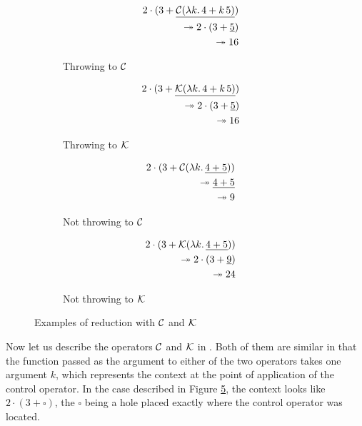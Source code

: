 \begin{figure}
\centering
\begin{subfigure}[t]{0.4\textwidth}
\begin{eqnarray*}
&&2 \cdot (3 + \underline{\mathcal{C}(\lambda k.\, 4 + k\, 5)}) \\
&&{} \twoheadrightarrow 2 \cdot (3 + \underline{5}) \\
&&{} \twoheadrightarrow 16
\end{eqnarray*}
\caption{Throwing to $\mathcal{C}$}\label{fig:CK-throwC}
\end{subfigure}
%
\begin{subfigure}[t]{0.4\textwidth}
\begin{eqnarray*}
&& 2 \cdot (3 + \underline{\mathcal{K}(\lambda k.\, 4 + k\, 5)}) \\
&& {} \twoheadrightarrow 2 \cdot (3 + \underline{5}) \\
&& {} \twoheadrightarrow 16
\end{eqnarray*}
\caption{Throwing to $\mathcal{K}$}\label{fig:CK-throwK}
\end{subfigure}

\begin{subfigure}[t]{0.4\textwidth}
\begin{eqnarray*}
&& 2 \cdot (3 + \mathcal{C}(\lambda k.\, \underline{4 + 5})) \\
&& {} \twoheadrightarrow \underline{4 + 5} \\
&& {} \twoheadrightarrow 9
\end{eqnarray*}
\caption{Not throwing to $\mathcal{C}$}\label{fig:CK-nothrowC}
\end{subfigure}
%
\begin{subfigure}[t]{0.4\textwidth}
\begin{eqnarray*}
&& 2 \cdot (3 + \mathcal{K}(\lambda k.\, \underline{4 + 5})) \\
&& {} \twoheadrightarrow 2 \cdot (3 + \underline{9}) \\
&& {} \twoheadrightarrow 24
\end{eqnarray*}
\caption{Not throwing to $\mathcal{K}$}\label{fig:CK-nothrowK}
\end{subfigure}

\caption{Examples of reduction with $\mathcal{C}$ and $\mathcal{K}$}
\label{fig:CK}
\end{figure}

Now let us describe the operators $\mathcal{C}$ and $\mathcal{K}$ in . Both of
them are similar in that the function passed
as the argument to either of the two operators takes one argument $k$, which represents
the context at the point of application of the control operator. In the case described
in Figure \ref{fig:CK}, the context
looks like $2 \cdot (3 + \square)$, the $\square$ being a hole placed exactly where
the control operator was located.

